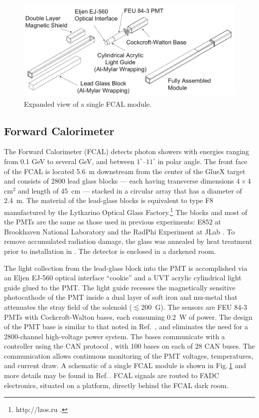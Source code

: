 \begin{figure}[tbp]\centering
\includegraphics[height=5cm]{figures/FCAL_single_module}
\caption{\label{fig:fcal:FCAL_single_module}
    Expanded view of a single FCAL module.
  }
\end{figure} 
\subsection{Forward Calorimeter \label{sec:fcal}}
The Forward Calorimeter (FCAL) detects photon showers with energies ranging from 0.1 GeV to several GeV, and  between $1^{\circ}$--$11^{\circ}$ in polar angle. The front face of the FCAL is located 5.6~m downstream from the center of the GlueX target and consists of 2800 lead glass blocks --- each having transverse dimensions $4\times4$ cm$^2$ and length of 45~cm ---  stacked in a circular array that has a diameter of 2.4~m.  The material of the lead-glass blocks is equivalent to type F8 manufactured by the Lytkarino Optical Glass Factory.\footnote{http://lzos.ru .} The blocks and most of the PMTs are the same as those used in previous experiments: E852 at Brookhaven National Laboratory \cite{CRITTENDEN1997377} and the RadPhi Experiment at JLab \cite{JONES2007384}. To remove accumulated radiation damage, the glass was annealed by heat treatment prior to installation in \gx{}. The detector is enclosed in a darkened room.

The light collection from the lead-glass block into the PMT is accomplished via an Eljen EJ-560 optical interface ``cookie'' and a UVT acrylic cylindrical light guide glued to the PMT. The light guide recesses the magnetically sensitive photocathode of the PMT inside a dual layer of soft iron and mu-metal that attenuates the stray field  of the \gx{} solenoid ($\lesssim$200~G). The sensors are FEU 84-3 PMTs with Cockcroft-Walton bases, each consuming 0.2~W of power.  The design of the PMT base is similar to that noted in Ref.~\cite{Brunner:1998fh}, and eliminates the need for a 2800-channel high-voltage power system. The bases communicate with a controller using the CAN protocol \cite{wiki:CANBus}, with 100 bases on each of 28 CAN buses.  The communication allows continuous monitoring of the PMT voltages, temperatures, and current draw.
A schematic of a single FCAL module is shown in 
Fig.\,\ref{fig:fcal:FCAL_single_module} and more details may be found in Ref.\,\cite{MORIYA201360}. FCAL signals are routed to FADC electronics, situated on a platform, directly behind the FCAL dark room.


